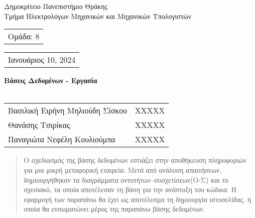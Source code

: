\thispagestyle{empty}
\begin{titlepage} 
    \thispagestyle{empty}
    \center
    \large{Δημοκρίτειο Πανεπιστήμιο Θράκης} \\ [0.2cm]
    \large {Τμήμα Ηλεκτρολόγων Μηχανικών και Μηχανικών Υπολογιστών} \\ [1.5cm]

    \begin{tabular}[t]{@{}l} 
      Ομάδα: 8
    \end{tabular}
    \hfill%
    \begin{tabular}[t]{l@{}}
       Ιανουάριος 10, 2024
    \end{tabular}

    \vspace{2.0cm}
    \huge {\bfseries {Βάσεις Δεδομένων - Εργασία}} \\[0.2cm]
    \Large {\bfseries {}} \\[0.5cm]

    \vspace{0.6cm}
    \begin{tabular}{ll}
        \large{Βασιλική Ειρήνη Μηλιούδη Σίσκου}    &  \large{ΧΧΧΧΧ} \\
        \large{Θανάσης Τσιρίκας}  &  \large{ΧΧΧΧΧ} \\
        \large{Παναγιώτα Νεφέλη Κουλιούμπα}     &  \large{ΧΧΧΧΧ} \\
    \end{tabular}

    \vspace{1.0cm}
    \begin{abstract}
        \noindent O σχεδιασμός της βάσης δεδομένων εστιάζει στην αποθήκευση πληροφοριών για μια μικρή μεταφορική εταιρεία. Μετά από ανάλυση απαιτήσεων, δημιουργήθηκαν τα διαγράμματα οντοτήτων–συσχετίσεων(Ο-Σ) και το σχεσιακό, τα οποία αποτέλεσαν τη βάση για την ανάπτυξη του κώδικα. Η εφαρμογή των παραπάνω θα έχει ως αποτέλεσμα τη δημιουργία ιστοσελίδας, η οποία θα ενσωματώνει μέρος της παραπάνω βάσης δεδομένων.
    \end{abstract}
\end{titlepage}